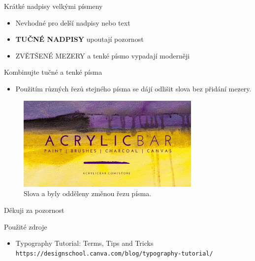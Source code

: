 \documentclass{beamer}
\begin{document}
\begin{frame}{Krátké nadpisy velkými písmeny}
	\begin{itemize}
		\item Nevhodné pro delší nadpisy nebo text
		\item \textbf{TUČNÉ NADPISY} upoutají pozornost
		\item {\lsstyle ZVĚTŠENÉ MEZERY} a tenké písmo vypadají moderněji
	\end{itemize}
\end{frame}




\begin{frame}{Kombinujte tučné a tenké písma}
	\begin{itemize}
		\item Použitím různých řezů stejného písma se dájí odlišit slova bez přidání mezery.
	\end{itemize}

	\begin{center}
		\begin{figure}[h]
			\includegraphics[width=90mm]{acrylicbar.jpg}
			\caption{Slova  a  byly odděleny změnou řezu písma.}
		\end{figure}
	\end{center} 
\end{frame}



\begin{frame}
	\begin{center}
		{\huge Děkuji za pozornost}
	\end{center}
\end{frame}

\begin{frame}[t]{Použité zdroje}
	\begin{itemize}
		\item Typography Tutorial: Terms, Tips and Tricks\\
		\small\texttt{https://designschool.canva.com/blog/typography-tutorial/}
	\end{itemize}
\end{frame}
\end{document}

